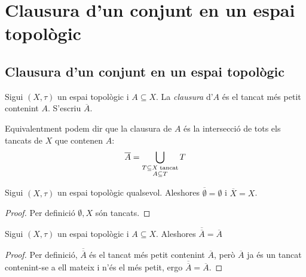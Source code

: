 \documentclass[../main.tex]{subfiles}
\begin{document}
\section{Clausura d'un conjunt en un espai topològic}
\subsection{Clausura d'un conjunt en un espai topològic}

\begin{defi}[Clausura]
\label{def:clausura} Sigui $(X,\tau)$ un espai topològic i $A\subseteq X$. La \textit{clausura} d'$A$ és el tancat més petit contenint $A$. S'escriu $\overline{A}$.
\end{defi}

Equivalentment podem dir que la clausura de $A$ és la intersecció de tots els tancats de $X$ que contenen $A$:
\begin{equation}
    \notag
    \overline{A} = \bigcup_{\substack{T\subseteq X\;\text{tancat}\\ A\subseteq T}} T
\end{equation}

\begin{prop}
\label{prop:clausura1} Sigui $(X,\tau)$ un espai topològic qualsevol. Aleshores $\overline{\emptyset} = \emptyset$ i $\overline{X}=X$.
\end{prop}
\begin{proof}
Per definició $\emptyset, X$ són tancats.
\end{proof}

\begin{prop}
\label{prop:clausura2} Sigui $(X,\tau)$ un espai topològic i $A\subseteq X$. Aleshores $\overline{\overline{A}} = \overline{A}$
\end{prop}
\begin{proof}
Per definició, $\overline{\overline{A}}$ és el tancat més petit contenint $\overline{A}$, però $\overline{A}$ ja és un tancat contenint-se a ell mateix i n'és el més petit, ergo $\overline{\overline{A}} = \overline{A}$.
\end{proof}
\end{document}
